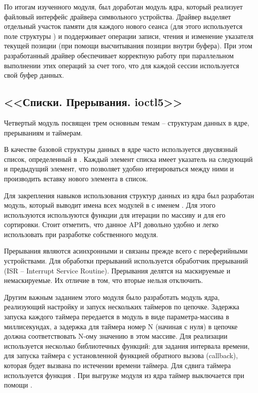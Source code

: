 По итогам изученного модуля, был доработан модуль ядра, который реализует файловый интерфейс драйвера символьного устройства. Драйвер выделяет отдельный участок памяти для каждого нового сеанса (для этого используется поле  структуры ) и поддерживает операции записи, чтения и изменение указателя текущей позиции  (при помощи высчитывания позиции внутри буфера). При этом разработанный драйвер обеспечивает корректную работу при параллельном выполнении этих операций за счет того, что для каждой сессии используется свой буфер данных.


\subsection{<<Списки. Прерывания. ioctl5>>}

Четвертый модуль посвящен трем основным темам -- структурам данных в ядре, прерываниям и таймерам.

В качестве базовой структуры данных в ядре часто используется двусвязный список, определенный в . Каждый элемент списка имеет указатель на следующий и предыдущий элемент, что позволяет удобно итерироваться между ними и производить вставку нового элемента в список.

Для закрепления навыков использования структур данных из ядра был разработан модуль, который выводит имена всех модулей в  с именем . Для этого используются используются функции  для итерации по массиву и  для его сортировки. Стоит отметить, что данное API довольно удобно и легко использовать при разработке собственного модуля.


Прерывания являются асинхронными и связаны прежде всего с переферийными устройствами. Для обработки прерываний используется обработчик прерываний (ISR -- Interrupt Service Routine). Прерывания делятся на маскируемые и немаскируемые. Их отличие в том, что вторые нельзя отключить.

Другим важным заданием этого модуля было разработать модуль ядра, реализующий настройку и запуск нескольких таймеров по цепочке. Задержка запуска каждого таймера передается в модуль в виде параметра-массива в миллисекундах, а задержка для таймера номер N (начиная с нуля) в цепочке должна соответствовать N-ому значению в этом массиве. Для реализации используется несколько библиотечных функций:  для задания интервала времени,  для запуска таймера с установленной функцией обратного вызова (callback), которая будет вызвана по истечении времени таймера. Для сдвига таймера используется функция . При выгрузке модуля из ядра таймер выключается при помощи .

